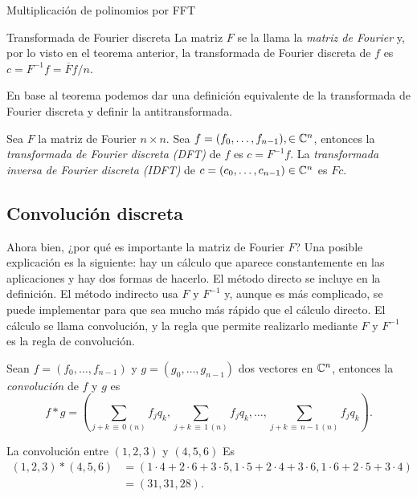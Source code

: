 \begin{chapter}{Multiplicación de polinomios por FFT}
\begin{section}{Transformada de Fourier discreta}
        La matriz $F$ se la llama la \textit{matriz de Fourier} y, por lo visto en el teorema anterior, la transformada de Fourier discreta de $f$ es $c = F^{-1}f=\overline{F}f/n$. 

        En  base al teorema podemos dar una definición equivalente de la transformada de Fourier discreta y definir la antitransformada. 
        
        \begin{definicion}
            Sea $F$ la matriz de Fourier $n \times n$. Sea  $f = (f_0,\ldots,f_{n-1}), \in \mathbb C^n$, entonces la \textit{transformada de Fourier discreta (DFT)} de $f$ es $c = F^{-1}f$. La \textit{transformada inversa de Fourier discreta (IDFT)} de $c = (c_0,\ldots,c_{n-1}) \in \mathbb C^n$ es $Fc$.  
        \end{definicion}

        \subsection*{Convolución discreta} 

        Ahora bien, ¿por  qué es importante la matriz de Fourier $F$? Una posible explicación es la siguiente: hay un cálculo que aparece constantemente en las aplicaciones y hay dos formas de hacerlo. El método directo se incluye en la definición. El método indirecto usa $F$ y $F^{-1}$ y, aunque es más complicado, se puede implementar para que sea mucho más rápido que el cálculo directo. El cálculo se llama {convolución}, y la regla que permite realizarlo mediante  $F$ y $F^{-1}$ es la {regla de convolución.} 

        \begin{definicion}
            Sean $f = (f_0,\ldots, f_{n-1})$ y $g = (g_0,\ldots, g_{n-1})$ dos vectores en $\mathbb C^n$,  entonces la  \textit{convolución} de $f$ y $g$ es 
            \begin{equation*}
                f * g = \left(\sum_{j+k \,\equiv\, 0\, (n)} f_jq_k, \sum_{j+k \,\equiv\, 1\, (n)} f_jq_k, \ldots, \sum_{j+k\, \equiv\, n-1 \,(n)} f_jq_k\right).
            \end{equation*}
        \end{definicion}

        \begin{ejemplo}
            La convolución entre $(1,2,3)$ y $(4,5,6)$ Es
            \begin{align*}
                (1,2,3)*(4,5,6) &= (1 \cdot 4 + 2\cdot 6 + 3\cdot 5, 1\cdot 5+  2\cdot 4 + 3\cdot 6, 1\cdot 6 + 2\cdot 5 + 3\cdot 4)\\ &= (31, 31, 28).
            \end{align*}
        \end{ejemplo}


\end{section}
\end{chapter}
